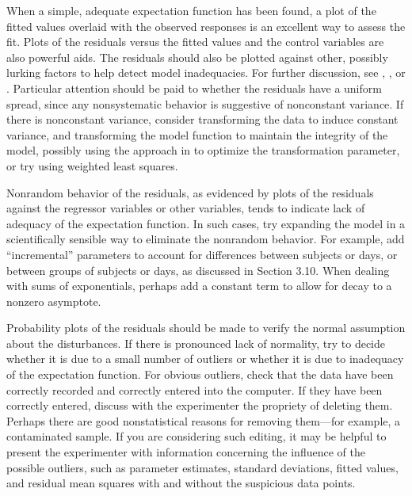 When a simple, adequate expectation function has been found, a
plot of the fitted values overlaid with the observed responses
is an excellent way to assess the fit.
Plots of the residuals versus the fitted values and the control
variables are also powerful aids.
The residuals should also be plotted against other, possibly
lurking factors to help detect model inadequacies.
For further discussion, see ,
, or .
Particular attention should be paid to whether the residuals have
a uniform spread, since any nonsystematic behavior is suggestive
of nonconstant variance.
If there is nonconstant variance, consider transforming the data
to induce constant variance, and transforming the model function
to maintain the integrity of the model, possibly using the approach in
 to optimize the transformation parameter,
or try using weighted least squares.

Nonrandom behavior of the residuals, as evidenced by plots of the
residuals against the regressor variables or other variables,
tends to indicate lack of adequacy of the expectation function.
In such cases, try expanding the model in a scientifically
sensible way to eliminate the nonrandom behavior.
For example, add ``incremental''
parameters to account for differences between
subjects or days, or between groups of subjects or days, as
discussed in Section 3.10.
When dealing with sums of exponentials, perhaps add a constant
term to allow for decay to a nonzero asymptote.

Probability plots of the residuals should be made to verify the normal
assumption about the disturbances.
If there is pronounced lack of normality, try to decide
whether it is due to a small number of outliers or whether it is
due to inadequacy of the expectation function.
For obvious outliers, check that the data have been correctly
recorded and correctly entered into the computer.
If they have been correctly entered, discuss
with the experimenter
the propriety of deleting them.
Perhaps there are good nonstatistical reasons for removing
them---for example, a contaminated sample.
If you are considering such editing, it may be helpful to present
the experimenter with information concerning the influence of the
possible outliers, such as parameter estimates,
standard deviations, fitted values, and residual mean squares
with and without the suspicious data points.

